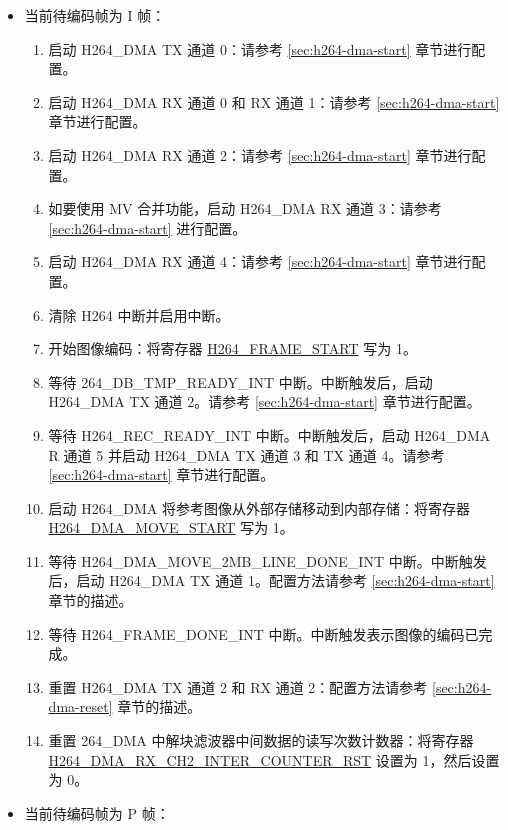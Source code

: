 \documentclass[main\_\_CN.tex]{subfiles}
\begin{document}
\begin{enumerate}
    \begin{itemize}
        \item 当前待编码帧为 I 帧：
        \begin{enumerate}
            \item 启动 H264\_DMA TX 通道 0：请参考 \ref{sec:h264-dma-start} 章节进行配置。
            \item 启动 H264\_DMA RX 通道 0 和 RX 通道 1：请参考 \ref{sec:h264-dma-start} 章节进行配置。
            \item 启动 H264\_DMA RX 通道 2：请参考 \ref{sec:h264-dma-start} 章节进行配置。
            \item 如要使用 MV 合并功能，启动 H264\_DMA RX 通道 3：请参考 \ref{sec:h264-dma-start} 进行配置。
            \item 启动 H264\_DMA RX 通道 4：请参考 \ref{sec:h264-dma-start} 章节进行配置。
            \item 清除 H264 中断并启用中断。
            \item 开始图像编码：将寄存器 \hyperref[fielddesc:H264FRAMESTART]{H264\_FRAME\_START} 写为 1。
            \item 等待 264\_DB\_TMP\_READY\_INT 中断。中断触发后，启动 H264\_DMA TX 通道 2。请参考 \ref{sec:h264-dma-start} 章节进行配置。
            \item 等待 H264\_REC\_READY\_INT 中断。中断触发后，启动 H264\_DMA R 通道 5 并启动 H264\_DMA TX 通道 3 和 TX 通道 4。请参考 \ref{sec:h264-dma-start} 章节进行配置。
            \item 启动 H264\_DMA 将参考图像从外部存储移动到内部存储：将寄存器 \hyperref[fielddesc:H264DMAMOVESTART]{H264\_DMA\_MOVE\_START} 写为 1。
            \item 等待 H264\_DMA\_MOVE\_2MB\_LINE\_DONE\_INT 中断。中断触发后，启动 H264\_DMA TX 通道 1。配置方法请参考 \ref{sec:h264-dma-start} 章节的描述。
            \item 等待 H264\_FRAME\_DONE\_INT 中断。中断触发表示图像的编码已完成。
            \item 重置 H264\_DMA TX 通道 2 和 RX 通道 2：配置方法请参考 \ref{sec:h264-dma-reset} 章节的描述。
            \item 重置 264\_DMA 中解块滤波器中间数据的读写次数计数器：将寄存器 \hyperref[fielddesc:H264DMARXCH2INTERCOUNTERRST]{H264\_DMA\_RX\_CH2\_INTER\_COUNTER\_RST} 设置为 1，然后设置为 0。
        \end{enumerate}
        \item 当前待编码帧为 P 帧：
        \begin{enumerate}

\end{enumerate}
\end{itemize}
\end{enumerate}
\end{document}
